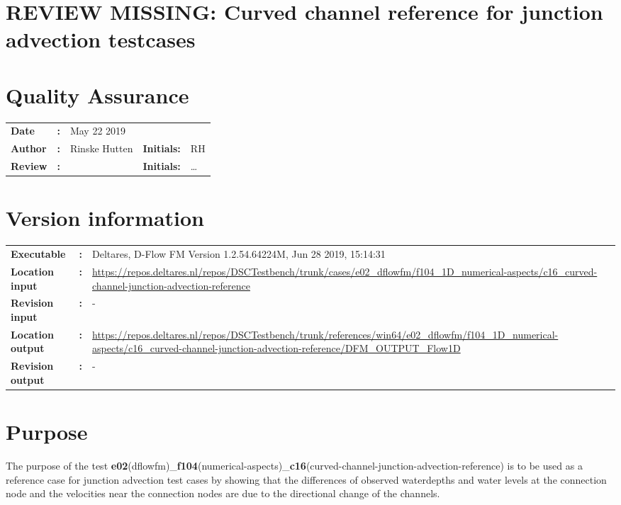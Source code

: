 

\section{REVIEW MISSING: Curved channel reference for junction advection testcases}
\newrefsegment

\section*{Quality Assurance}
\begin{tabular}{@{}p{27mm}@{}p{0mm}p{\textwidth-52mm-48pt}p{15mm}p{10mm}}
\textbf{Date} & \textbf{:} & May 22 2019  \\ 
\textbf{Author} & \textbf{:} & Rinske Hutten  & \textbf{Initials:} & RH \\
\textbf{Review} & \textbf{:} &   & \textbf{Initials:} & \ldots 
\end{tabular}

\section*{Version information}
{{
\begin{tabular}{@{}p{27mm}@{}p{0mm}p{\textwidth-27mm-24pt}}
\textbf{Executable}   & \textbf{:} & Deltares, D-Flow FM Version 1.2.54.64224M, Jun 28 2019, 15:14:31  \\
\textbf{Location input}     & \textbf{:} & \url{https://repos.deltares.nl/repos/DSCTestbench/trunk/cases/e02_dflowfm/f104_1D_numerical-aspects/c16_curved-channel-junction-advection-reference} \\
\textbf{Revision input} & \textbf{:} & - \\
\textbf{Location output}  & \textbf{:} & \url{https://repos.deltares.nl/repos/DSCTestbench/trunk/references/win64/e02_dflowfm/f104_1D_numerical-aspects/c16_curved-channel-junction-advection-reference/DFM_OUTPUT_Flow1D} \\
\textbf{Revision output} & \textbf{:} & -
\end{tabular}
}}

\section*{Purpose}
The purpose of the test \textbf{e02}(dflowfm)\_\textbf{f104}(numerical-aspects)\_\textbf{c16}(curved-channel-junction-advection-reference) is to be used as a reference case for junction advection test cases by showing that the differences of observed waterdepths and water levels at the connection node and the velocities near the connection nodes are due to the directional change of the channels. 

